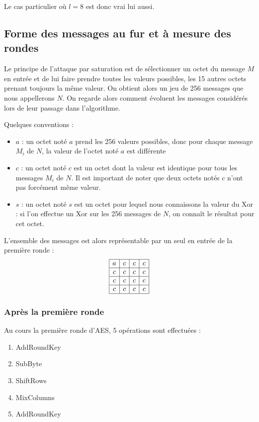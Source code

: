 \documentclass[a4paper,11pt]{article}
\begin{document}
Le cas particulier où $l=8$ est donc vrai lui aussi.

\subsection*{Forme des messages au fur et à mesure des rondes}

Le principe de l'attaque par saturation est de sélectionner un octet du message $M$ en entrée et de
lui faire prendre toutes les valeurs possibles, les 15 autres octets prenant toujours la même
valeur. On obtient alors un jeu de 256 messages que nous appellerons $N$. On regarde alors comment
évoluent les messages considérés lors de leur passage dans l'algorithme.

Quelques conventions : \begin{itemize}
    \item $a$ : un octet noté $a$ prend les 256 valeurs possibles, donc pour chaque message $M_i$ de
        $N$, la valeur de l'octet noté $a$ est différente
    \item $c$ : un octet noté $c$ est un octet dont la valeur est identique pour tous les messages
        $M_i$ de $N$. Il est important de noter que deux octets notés $c$ n'ont pas forcément même
        valeur.
    \item $s$ : un octet noté $s$ est un octet pour lequel nous connaissons la valeur du Xor : si
        l'on effectue un Xor sur les 256 messages de $N$, on connaît le résultat pour cet octet.
\end{itemize}

L'ensemble des messages est alors représentable par un seul en entrée de la première ronde :
\begin{displaymath}
    \begin{array}{|c|c|c|c|} \hline
        a & c & c & c \\ \hline
        c & c & c & c \\ \hline
        c & c & c & c \\ \hline
        c & c & c & c \\ \hline
    \end{array}
\end{displaymath}

\subsubsection*{Après la première ronde}

Au cours la première ronde d'AES, 5 opérations sont effectuées : 
\begin{enumerate}
    \item AddRoundKey
    \item SubByte
    \item ShiftRows
    \item MixColumns
    \item AddRoundKey
\end{enumerate}
\end{document}
